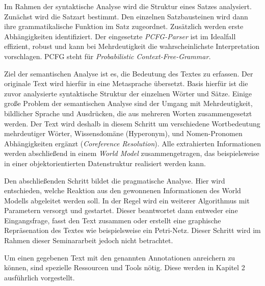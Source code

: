\par
Im Rahmen der syntaktische Analyse wird die Struktur eines Satzes analysiert. Zunächst wird die Satzart bestimmt. Den einzelnen Satzbausteinen wird dann ihre grammatikalische Funktion im Satz zugeordnet. Zusätzlich werden erste Abhängigkeiten identifiziert. Der eingesetzte \textit{PCFG-Parser} ist im Idealfall effizient, robust und kann bei Mehrdeutigkeit die wahrscheinlichste Interpretation vorschlagen. PCFG steht für \textit{Probabilistic Context-Free-Grammar.}
\par
Ziel der semantischen Analyse ist es, die Bedeutung des Textes zu erfassen. Der originale Text wird hierfür in eine Metasprache übersetzt. Basis hierfür ist die zuvor analysierte syntaktische Struktur der einzelnen Wörter und Sätze. Einige große Problem der semantischen Analyse sind der Umgang mit Mehrdeutigkeit, bildlicher Sprache und Ausdrücken, die aus mehreren Worten zusammengesetzt werden. Der Text wird deshalb in diesem Schritt um verschiedene Wortbedeutung mehrdeutiger Wörter, Wissensdomäne (Hyperonym), und Nomen-Pronomen Abhängigkeiten ergänzt (\textit{Coreference Resolution}). Alle extrahierten Informationen werden abschließend in einem \textit{World Model} zusammengetragen, das beispielsweise in einer objektorientierten Datenstruktur realisiert werden kann.

\par
Den abschließenden Schritt bildet die pragmatische Analyse. Hier wird entschieden, welche Reaktion aus den gewonnenen Informationen des World Modells abgeleitet werden soll. In der Regel wird ein weiterer Algorithmus mit Parametern versorgt und gestartet. Dieser beantwortet dann entweder eine Eingangsfrage, fasst den Text zusammen oder erstellt eine graphische Repräsenation des Textes wie beispielsweise ein Petri-Netz. Dieser Schritt wird im Rahmen dieser Seminararbeit jedoch nicht betrachtet.

Um einen gegebenen Text mit den genannten Annotationen anreichern zu können, sind spezielle Ressourcen und Tools nötig. Diese werden in Kapitel 2 ausführlich vorgestellt.







